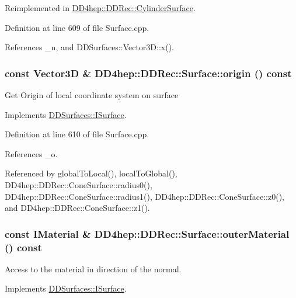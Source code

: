 Reimplemented in \hyperlink{class_d_d4hep_1_1_d_d_rec_1_1_cylinder_surface_a42de2f110f904bf4d4862bd0b149d49a}{DD4hep::DDRec::CylinderSurface}.

Definition at line 609 of file Surface.cpp.

References \_\-n, and DDSurfaces::Vector3D::x().\hypertarget{class_d_d4hep_1_1_d_d_rec_1_1_surface_ad3b8710337ded85b4b277eca2d38cc8a}{
\subsubsection[{origin}]{\setlength{\rightskip}{0pt plus 5cm}const {\bf Vector3D} \& DD4hep::DDRec::Surface::origin () const}}
\label{class_d_d4hep_1_1_d_d_rec_1_1_surface_ad3b8710337ded85b4b277eca2d38cc8a}
Get Origin of local coordinate system on surface 

Implements \hyperlink{class_d_d_surfaces_1_1_i_surface_a552cf76ca76154d0a6d9709d826b57f4}{DDSurfaces::ISurface}.

Definition at line 610 of file Surface.cpp.

References \_\-o.

Referenced by globalToLocal(), localToGlobal(), DD4hep::DDRec::ConeSurface::radius0(), DD4hep::DDRec::ConeSurface::radius1(), DD4hep::DDRec::ConeSurface::z0(), and DD4hep::DDRec::ConeSurface::z1().\hypertarget{class_d_d4hep_1_1_d_d_rec_1_1_surface_a8844d989cfc893e8fc5e34d05cb2e410}{
\subsubsection[{outerMaterial}]{\setlength{\rightskip}{0pt plus 5cm}const {\bf IMaterial} \& DD4hep::DDRec::Surface::outerMaterial () const}}
\label{class_d_d4hep_1_1_d_d_rec_1_1_surface_a8844d989cfc893e8fc5e34d05cb2e410}


Access to the material in direction of the normal. 

Implements \hyperlink{class_d_d_surfaces_1_1_i_surface_a49dfd8a5eef419226abc675b8d1126a5}{DDSurfaces::ISurface}.

